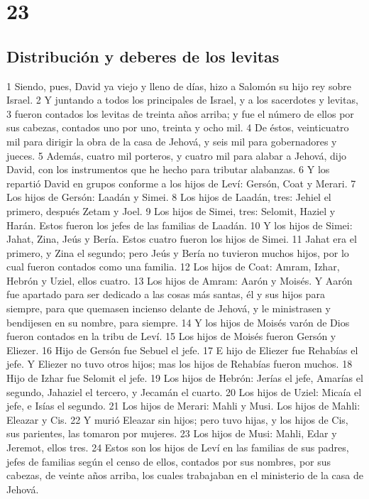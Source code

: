 \chapter{23}

\section*{Distribución y deberes de los levitas}


1 Siendo, pues, David ya viejo y lleno de días, hizo a Salomón su hijo rey sobre Israel. 
2 Y juntando a todos los principales de Israel, y a los sacerdotes y levitas,
3 fueron contados los levitas de treinta años arriba; y fue el número de ellos por sus cabezas, contados uno por uno, treinta y ocho mil.
4 De éstos, veinticuatro mil para dirigir la obra de la casa de Jehová, y seis mil para gobernadores y jueces.
5 Además, cuatro mil porteros, y cuatro mil para alabar a Jehová, dijo David, con los instrumentos que he hecho para tributar alabanzas.
6 Y los repartió David en grupos conforme a los hijos de Leví: Gersón, Coat y Merari.
7 Los hijos de Gersón: Laadán y Simei.
8 Los hijos de Laadán, tres: Jehiel el primero, después Zetam y Joel.
9 Los hijos de Simei, tres: Selomit, Haziel y Harán. Estos fueron los jefes de las familias de Laadán.
10 Y los hijos de Simei: Jahat, Zina, Jeús y Bería. Estos cuatro fueron los hijos de Simei.
11 Jahat era el primero, y Zina el segundo; pero Jeús y Bería no tuvieron muchos hijos, por lo cual fueron contados como una familia.
12 Los hijos de Coat: Amram, Izhar, Hebrón y Uziel, ellos cuatro.
13 Los hijos de Amram: Aarón y Moisés. Y Aarón fue apartado para ser dedicado a las cosas más santas, él y sus hijos para siempre, para que quemasen incienso delante de Jehová, y le ministrasen y bendijesen en su nombre, para siempre. 
14 Y los hijos de Moisés varón de Dios fueron contados en la tribu de Leví.
15 Los hijos de Moisés fueron Gersón y Eliezer.
16 Hijo de Gersón fue Sebuel el jefe.
17 E hijo de Eliezer fue Rehabías el jefe. Y Eliezer no tuvo otros hijos; mas los hijos de Rehabías fueron muchos.
18 Hijo de Izhar fue Selomit el jefe.
19 Los hijos de Hebrón: Jerías el jefe, Amarías el segundo, Jahaziel el tercero, y Jecamán el cuarto.
20 Los hijos de Uziel: Micaía el jefe, e Isías el segundo.
21 Los hijos de Merari: Mahli y Musi. Los hijos de Mahli: Eleazar y Cis.
22 Y murió Eleazar sin hijos; pero tuvo hijas, y los hijos de Cis, sus parientes, las tomaron por mujeres.
23 Los hijos de Musi: Mahli, Edar y Jeremot, ellos tres.
24 Estos son los hijos de Leví en las familias de sus padres, jefes de familias según el censo de ellos, contados por sus nombres, por sus cabezas, de veinte años arriba, los cuales trabajaban en el ministerio de la casa de Jehová.
